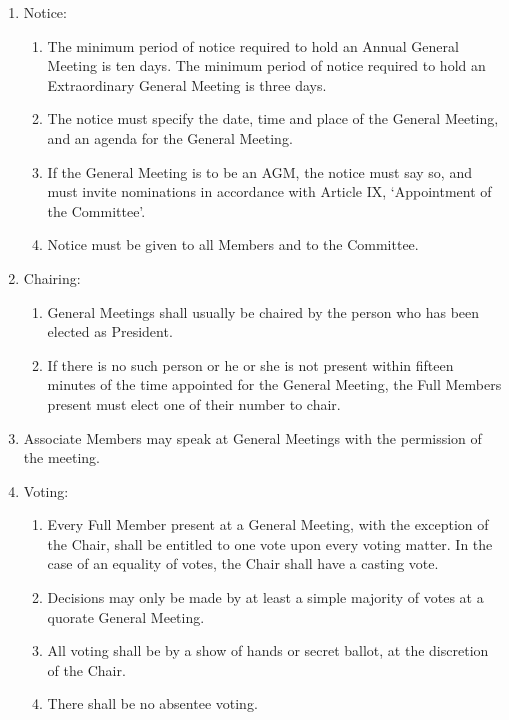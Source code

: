 \documentclass[12pt]{constitution}
\begin{document}
\begin{enumerate}
    \item Notice:
    \begin{enumerate}
        \item The minimum period of notice required to hold an Annual General Meeting is ten days.  The minimum period of notice required to hold an Extraordinary General Meeting is three days.
        \item The notice must specify the date, time and place of the General Meeting, and an agenda for the General Meeting.
        \item If the General Meeting is to be an AGM, the notice must say so, and must invite nominations in accordance with Article IX, `Appointment of the Committee'.
        \item Notice must be given to all Members and to the Committee.
    \end{enumerate}

    \item Chairing:
    \begin{enumerate}
        \item General Meetings shall usually be chaired by the person who has been elected as President.
        \item If there is no such person or he or she is not present within fifteen minutes of the time appointed for the General Meeting, the Full Members present must elect one of their number to chair.
    \end{enumerate}

    \item Associate Members may speak at General Meetings with the permission of the meeting.

    \item Voting:
    \begin{enumerate}
        \item Every Full Member present at a General Meeting, with the exception of the Chair, shall be entitled to one vote upon every voting matter.  In the case of an equality of votes, the Chair shall have a casting vote.
        \item Decisions may only be made by at least a simple majority of votes at a quorate General Meeting.
        \item All voting shall be by a show of hands or secret ballot, at the discretion of the Chair. 
        \item There shall be no absentee voting.
    \end{enumerate}


\end{enumerate}
\end{document}

